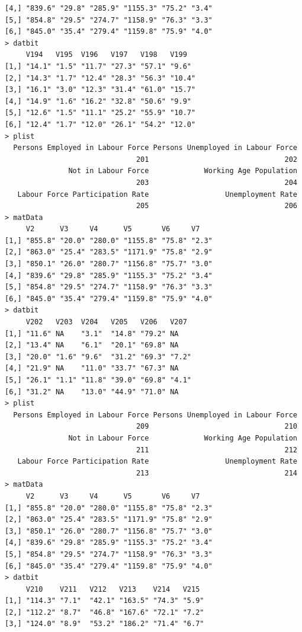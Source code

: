 \documentclass[a4paper]{article}
\begin{document}
\begin{verbatim}
[4,] "839.6" "29.8" "285.9" "1155.3" "75.2" "3.4"
[5,] "854.8" "29.5" "274.7" "1158.9" "76.3" "3.3"
[6,] "845.0" "35.4" "279.4" "1159.8" "75.9" "4.0"
> datbit 
     V194   V195  V196   V197   V198   V199  
[1,] "14.1" "1.5" "11.7" "27.3" "57.1" "9.6" 
[2,] "14.3" "1.7" "12.4" "28.3" "56.3" "10.4"
[3,] "16.1" "3.0" "12.3" "31.4" "61.0" "15.7"
[4,] "14.9" "1.6" "16.2" "32.8" "50.6" "9.9" 
[5,] "12.6" "1.5" "11.1" "25.2" "55.9" "10.7"
[6,] "12.4" "1.7" "12.0" "26.1" "54.2" "12.0"
> plist 
  Persons Employed in Labour Force Persons Unemployed in Labour Force 
                               201                                202 
               Not in Labour Force             Working Age Population 
                               203                                204 
   Labour Force Participation Rate                  Unemployment Rate 
                               205                                206 
> matData 
     V2      V3     V4      V5       V6     V7   
[1,] "855.8" "20.0" "280.0" "1155.8" "75.8" "2.3"
[2,] "863.0" "25.4" "283.5" "1171.9" "75.8" "2.9"
[3,] "850.1" "26.0" "280.7" "1156.8" "75.7" "3.0"
[4,] "839.6" "29.8" "285.9" "1155.3" "75.2" "3.4"
[5,] "854.8" "29.5" "274.7" "1158.9" "76.3" "3.3"
[6,] "845.0" "35.4" "279.4" "1159.8" "75.9" "4.0"
> datbit 
     V202   V203  V204   V205   V206   V207 
[1,] "11.6" NA    "3.1"  "14.8" "79.2" NA   
[2,] "13.4" NA    "6.1"  "20.1" "69.8" NA   
[3,] "20.0" "1.6" "9.6"  "31.2" "69.3" "7.2"
[4,] "21.9" NA    "11.0" "33.7" "67.3" NA   
[5,] "26.1" "1.1" "11.8" "39.0" "69.8" "4.1"
[6,] "31.2" NA    "13.0" "44.9" "71.0" NA   
> plist 
  Persons Employed in Labour Force Persons Unemployed in Labour Force 
                               209                                210 
               Not in Labour Force             Working Age Population 
                               211                                212 
   Labour Force Participation Rate                  Unemployment Rate 
                               213                                214 
> matData 
     V2      V3     V4      V5       V6     V7   
[1,] "855.8" "20.0" "280.0" "1155.8" "75.8" "2.3"
[2,] "863.0" "25.4" "283.5" "1171.9" "75.8" "2.9"
[3,] "850.1" "26.0" "280.7" "1156.8" "75.7" "3.0"
[4,] "839.6" "29.8" "285.9" "1155.3" "75.2" "3.4"
[5,] "854.8" "29.5" "274.7" "1158.9" "76.3" "3.3"
[6,] "845.0" "35.4" "279.4" "1159.8" "75.9" "4.0"
> datbit 
     V210    V211   V212   V213    V214   V215  
[1,] "114.3" "7.1"  "42.1" "163.5" "74.3" "5.9" 
[2,] "112.2" "8.7"  "46.8" "167.6" "72.1" "7.2" 
[3,] "124.0" "8.9"  "53.2" "186.2" "71.4" "6.7" 

\end{verbatim}
\end{document}
